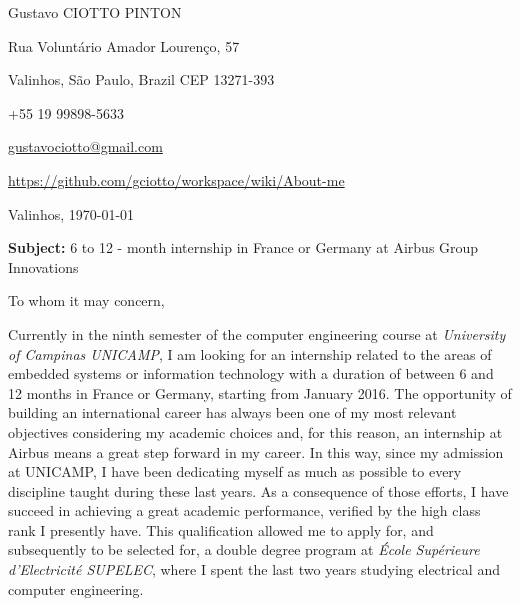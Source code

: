 \documentclass[12pt, a4paper]{article}
\begin{document}
\pagestyle{empty} 

Gustavo CIOTTO PINTON

Rua Voluntário Amador Lourenço, 57

Valinhos, São Paulo, Brazil CEP 13271-393

+55 19 99898-5633

 \url{gustavociotto@gmail.com}

\url{https://github.com/gciotto/workspace/wiki/About-me}
\begin{flushright}
\vspace{-12pt}
Valinhos,  \today





\end{flushright}

\textbf{Subject:} 6 to 12 - month internship in France or Germany at Airbus
Group Innovations 

\vspace{12pt} 

To whom it may concern, 

\vspace{12pt}
Currently in the ninth semester of the computer engineering course at
\textit{University of Campinas UNICAMP}, I am looking for an internship related
to the areas of embedded systems or information technology with  a duration of
between 6 and 12 months in France or Germany, starting from January 2016. The
opportunity of building an international career has always been one of my most
relevant objectives considering my academic choices and, for this reason, an
internship at Airbus means a great step forward in my career. In this
way, since my admission at UNICAMP, I have been dedicating myself as much as possible to every
discipline taught during these last years. As a consequence of those
efforts, I have succeed in achieving a great academic performance, verified by
the high class rank I presently have. This qualification allowed me to apply
for, and subsequently to be selected for, a double degree program at
\textit{École Supérieure d'Electricité SUPELEC}, where I spent the last two
years studying electrical and computer engineering.  
\end{document}
